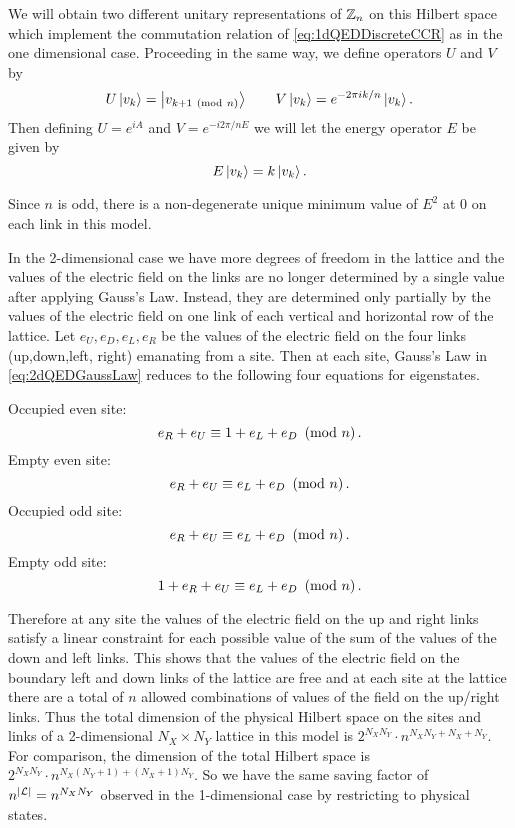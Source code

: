 \documentclass[11pt,reqno]{amsart}
\numberwithin{equation}{section}
\begin{document}
	We will obtain two different unitary representations of $\mathbb{Z}_n$ on this Hilbert space which implement the commutation relation of \cref{eq:1dQEDDiscreteCCR} as in the one dimensional case.
	Proceeding in the same way, we define operators $U$ and $V$ by
	\begin{equation}
		U\ket{v_k}=\ket{v_{k+1 \ \left(\mathrm{mod}\ n\right)}} \qquad V\ket{v_k}= e^{-2\pi i k/n} \ket{v_k}.
	\end{equation}
	Then defining $U=e^{iA}$ and $V=e^{-i2\pi/n E}$ we will let the energy operator $E$ be given by
	\begin{equation}
		E\ket{v_k}=k\ket{v_k}.
	\end{equation}
	
	Since $n$ is odd, there is a non-degenerate unique minimum value of $E^2$ at 0 on each link in this model.
	
	In the 2-dimensional case we have more degrees of freedom in the lattice and the values of the electric field on the links are no longer determined by a single value after applying Gauss's Law.
	Instead, they are determined only partially by the values of the electric field on one link of each vertical and horizontal row of the lattice. 
	Let $e_U,e_D,e_L,e_R$ be the values of the electric field on the four links (up,down,left, right) emanating from a site.
	Then at each site, Gauss's Law in \cref{eq:2dQEDGaussLaw} reduces to the following four equations for eigenstates.
	
	Occupied even site:
		\[ e_R+e_U \equiv 1+e_L+e_D \ \left(\mathrm{mod}\ n\right). \]
	Empty even site:
		\[ e_R+e_U \equiv e_L+e_D \ \left(\mathrm{mod}\ n\right). \]
	Occupied odd site:
		\[ e_R+e_U \equiv e_L+e_D \ \left(\mathrm{mod}\ n\right). \]
	Empty odd site:
		\[ 1+e_R+e_U \equiv e_L+e_D \ \left(\mathrm{mod}\ n\right). \]
	
	Therefore at any site the values of the electric field on the up and right links satisfy a linear constraint for each possible value of the sum of the values of the down and left links.
	This shows that the values of the electric field on the boundary left and down links of the lattice are free and at each site at the lattice there are a total of $n$ allowed combinations of values of the field on the up/right links.
	Thus the total dimension of the physical Hilbert space on the sites and links of a 2-dimensional $N_X\times N_Y$ lattice in this model is $2^{N_X N_Y} \cdot n^{N_X N_Y + N_X+ N_Y}$.
	For comparison, the dimension of the total Hilbert space is $2^{N_X N_Y} \cdot n^{N_X(N_Y+1)+(N_X+1)N_Y}$.
	So we have the same saving factor of $n^{|\mathcal{L}|}=n^{N_X N_Y}$ observed in the 1-dimensional case by restricting to physical states.\\
	
\end{document}

